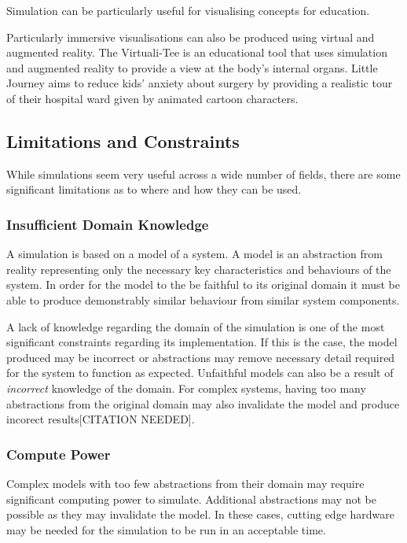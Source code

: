 \documentclass{UoYCSproject}
\begin{document}
Simulation can be particularly useful for visualising concepts for education. 

Particularly immersive visualisations can also be produced using virtual and augmented reality. The Virtuali-Tee is an educational tool that uses simulation and augmented reality to provide a view at the body's internal organs\cite{curiscope}. Little Journey aims to reduce kids' anxiety about surgery by providing a realistic tour of their hospital ward given by animated cartoon characters\cite{little_journey}.

\subsection{Limitations and Constraints}
While simulations seem very useful across a wide number of fields, there are some significant limitations as to where and how they can be used.

\subsubsection{Insufficient Domain Knowledge}
\label{domain_knowledge}
A simulation is based on a model of a system.
A model is an abstraction from reality representing only the necessary key characteristics and behaviours of the system.
In order for the model to the be faithful to its original domain it must be able to produce demonstrably similar behaviour from similar system components.

A lack of knowledge regarding the domain of the simulation is one of the most significant constraints regarding its implementation.
If this is the case, the model produced may be incorrect or abstractions may remove necessary detail required for the system to function as expected.
Unfaithful models can also be a result of \textit{incorrect} knowledge of the domain.
For complex systems, having too many abstractions from the original domain may also invalidate the model and produce incorect results[CITATION NEEDED].

\subsubsection{Compute Power}
Complex models with too few abstractions from their domain may require significant computing power to simulate. Additional abstractions may not be possible as they may invalidate the model. In these cases, cutting edge hardware may be needed for the simulation to be run in an acceptable time. 
\end{document}
